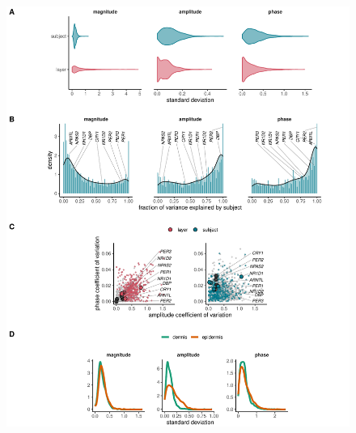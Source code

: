 \begin{figure}[b!]
	\begin{center}
		\includegraphics[width=\textwidth]{./Figures/fig2.pdf}
		

\end{center}
\end{figure}
